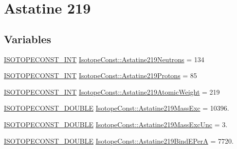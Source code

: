 \hypertarget{group___isotope_const-_astatine-_at219}{}\section{Astatine 219}
\label{group___isotope_const-_astatine-_at219}
\subsection*{Variables}
\begin{DoxyCompactItemize}
\item 
\mbox{\hyperlink{group___isotope_const-_macros_ga5f18360b3e99483a35c32d789e62621c}{I\+S\+O\+T\+O\+P\+E\+C\+O\+N\+S\+T\+\_\+\+I\+NT}} \mbox{\hyperlink{group___isotope_const-_astatine-_at219_ga38b213a3812e82b984062d93e6b8de84}{Isotope\+Const\+::\+Astatine219\+Neutrons}} = 134
\item 
\mbox{\hyperlink{group___isotope_const-_macros_ga5f18360b3e99483a35c32d789e62621c}{I\+S\+O\+T\+O\+P\+E\+C\+O\+N\+S\+T\+\_\+\+I\+NT}} \mbox{\hyperlink{group___isotope_const-_astatine-_at219_gac90f7175a1cf4ac277dd4b725090cce3}{Isotope\+Const\+::\+Astatine219\+Protons}} = 85
\item 
\mbox{\hyperlink{group___isotope_const-_macros_ga5f18360b3e99483a35c32d789e62621c}{I\+S\+O\+T\+O\+P\+E\+C\+O\+N\+S\+T\+\_\+\+I\+NT}} \mbox{\hyperlink{group___isotope_const-_astatine-_at219_ga4c1c5a3239024ebceea1979a61138c80}{Isotope\+Const\+::\+Astatine219\+Atomic\+Weight}} = 219
\item 
\mbox{\hyperlink{group___isotope_const-_macros_ga8f45a7272ce02c0b4c65c44636ed719a}{I\+S\+O\+T\+O\+P\+E\+C\+O\+N\+S\+T\+\_\+\+D\+O\+U\+B\+LE}} \mbox{\hyperlink{group___isotope_const-_astatine-_at219_gabca1eb0d8b3d784d15675acd7782c9ed}{Isotope\+Const\+::\+Astatine219\+Mass\+Exc}} = 10396.
\item 
\mbox{\hyperlink{group___isotope_const-_macros_ga8f45a7272ce02c0b4c65c44636ed719a}{I\+S\+O\+T\+O\+P\+E\+C\+O\+N\+S\+T\+\_\+\+D\+O\+U\+B\+LE}} \mbox{\hyperlink{group___isotope_const-_astatine-_at219_ga29f9f1922627be06bdb29a69bc5d5a81}{Isotope\+Const\+::\+Astatine219\+Mass\+Exc\+Unc}} = 3.
\item 
\mbox{\hyperlink{group___isotope_const-_macros_ga8f45a7272ce02c0b4c65c44636ed719a}{I\+S\+O\+T\+O\+P\+E\+C\+O\+N\+S\+T\+\_\+\+D\+O\+U\+B\+LE}} \mbox{\hyperlink{group___isotope_const-_astatine-_at219_gadd744470a4c5191b170118c04f22170b}{Isotope\+Const\+::\+Astatine219\+Bind\+E\+PerA}} = 7720.
\item 

\end{DoxyCompactItemize}
